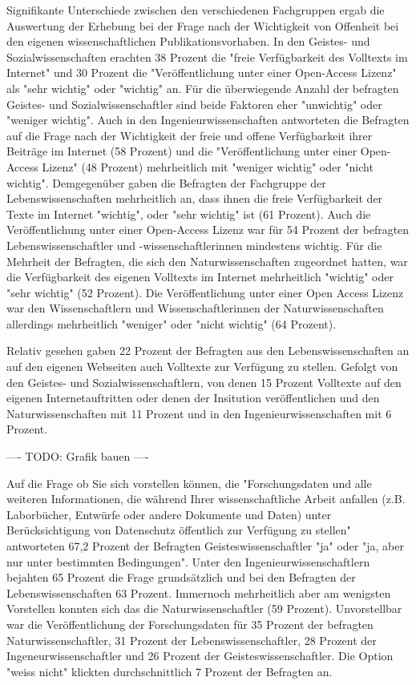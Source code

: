 Signifikante Unterschiede zwischen den verschiedenen Fachgruppen ergab die Auswertung der Erhebung bei der Frage nach der Wichtigkeit von Offenheit bei den eigenen wissenschaftlichen Publikationsvorhaben. In den Geistes- und Sozialwissenschaften erachten 38 Prozent die "freie Verfügbarkeit des Volltexts im Internet" und 30 Prozent die "Veröffentlichung unter einer Open-Access Lizenz" als "sehr wichtig" oder "wichtig" an. Für die überwiegende Anzahl der befragten Geistes- und Sozialwissenschaftler sind beide Faktoren eher "unwichtig" oder "weniger wichtig". Auch in den Ingenieurwissenschaften antworteten die Befragten auf die Frage nach der Wichtigkeit der freie und offene Verfügbarkeit ihrer Beiträge im Internet (58 Prozent) und die "Veröffentlichung unter einer Open-Access Lizenz" (48 Prozent) mehrheitlich mit "weniger wichtig" oder "nicht wichtig". Demgegenüber gaben die Befragten der Fachgruppe der Lebenswissenschaften mehrheitlich an, dass ihnen die freie Verfügbarkeit der Texte im Internet "wichtig", oder "sehr wichtig" ist (61 Prozent). Auch die Veröffentlichung unter einer Open-Access Lizenz war für 54 Prozent der befragten Lebenswissenschaftler und -wissenschaftlerinnen mindestens wichtig. Für die Mehrheit der Befragten, die sich den Naturwissenschaften zugeordnet hatten, war die Verfügbarkeit des eigenen Volltexts im Internet mehrheitlich "wichtig" oder "sehr wichtig" (52 Prozent). Die Veröffentlichung unter einer Open Access Lizenz war den Wissenschaftlern und Wissenschaftlerinnen der Naturwissenschaften allerdings mehrheitlich "weniger" oder "nicht wichtig" (64 Prozent).

Relativ gesehen gaben 22 Prozent der Befragten aus den Lebenswissenschaften an auf den eigenen Webseiten auch Volltexte zur Verfügung zu stellen. Gefolgt von den Geistes- und Sozialwissenschaftlern, von denen 15 Prozent Volltexte auf den eigenen Internetauftritten oder denen der Insitution veröffentlichen und den Naturwissenschaften mit 11 Prozent und in den Ingenieurwissenschaften mit 6 Prozent.

---- TODO: Grafik bauen ----

Auf die Frage ob Sie sich vorstellen können, die "Forschungsdaten und alle weiteren Informationen, die während Ihrer wissenschaftliche Arbeit anfallen (z.B. Laborbücher, Entwürfe oder andere Dokumente und Daten) unter Berücksichtigung von Datenschutz öffentlich zur Verfügung zu stellen" antworteten 67,2 Prozent der Befragten Geisteswissenschaftler "ja" oder "ja, aber nur unter bestimmten Bedingungen". Unter den Ingenieurwissenschaftlern bejahten 65 Prozent die Frage grundsätzlich und bei den Befragten der Lebenswissenschaften 63 Prozent. Immernoch mehrheitlich aber am wenigsten Vorstellen konnten sich das die Naturwissenschaftler (59 Prozent). Unvorstellbar war die Veröffentlichung der Forschungsdaten für 35 Prozent der befragten Naturwissenschaftler, 31 Prozent der Lebenswissenschaftler, 28 Prozent der Ingeneurwissenschaftler und 26 Prozent der Geisteswissenschaftler. Die Option "weiss nicht" klickten durchschnittlich 7 Prozent der Befragten an.

